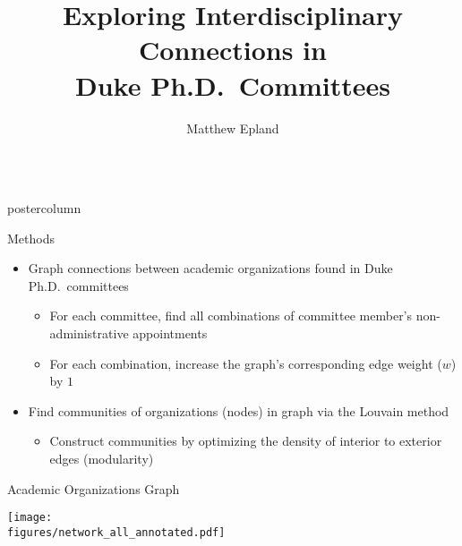 \documentclass{beamer}
\title{\huge Exploring Interdisciplinary Connections in\\Duke Ph.D.\ Committees}
\author{Matthew Epland}
\institute[Duke]{Duke University}
\newcommand{\figures}{../outputs/plots}
\newlength{\columnheight}
\begin{document}
\begin{frame}
\vspace{1.7cm} %
\begin{columns}
\begin{column}{.57\textwidth}
\begin{beamercolorbox}[center]{postercolumn}
\begin{minipage}{.98\textwidth}  %
\parbox[t][\columnheight]{\textwidth}{ %

  \begin{myblock}{Methods}
    \begin{itemize}
      \item Graph connections between academic organizations found in Duke Ph.D.\ committees
      \begin{itemize}
        \item For each committee, find all combinations of committee member's non-administrative appointments
        \item For each combination, increase the graph's corresponding edge weight ($w$) by $1$
      \end{itemize}
    \end{itemize}

    \vspace{0.5cm}

    \begin{center}
    \end{center}

    \vspace{0.5cm}

    \begin{itemize}
      \item Find communities of organizations (nodes) in graph via the Louvain method \cite{louvain}
      \begin{itemize}
        \item Construct communities by optimizing the density of interior to exterior edges (modularity)
      \end{itemize}
    \end{itemize}
  \end{myblock}\vfill


  \begin{myblock}{Academic Organizations Graph}
    \vspace{0.8cm}
    \begin{center}
      \texttt{[image: \\figures/network\_all\_annotated.pdf]}
    \end{center}
  \end{myblock}\vfill


}
\end{minipage}
\end{beamercolorbox}
\end{column}
\end{columns}
\end{frame}
\end{document}

